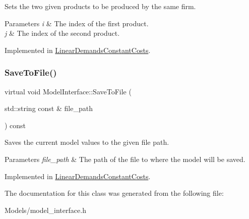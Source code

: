Sets the two given products to be produced by the same firm.


\begin{DoxyParams}{Parameters}
{\em i} & The index of the first product. \\
\hline
{\em j} & The index of the second product. \\
\hline
\end{DoxyParams}


Implemented in \hyperlink{classLinearDemandsConstantCosts_a0ee422d927b5a85f9aba8782b02f537b}{Linear\+Demands\+Constant\+Costs}.

\mbox{\label{classModelInterface_ab5709db8ecb96fd9efd02f4777d5502a}} 
\subsubsection{\texorpdfstring{Save\+To\+File()}{SaveToFile()}}
{\footnotesize\ttfamily virtual void Model\+Interface\+::\+Save\+To\+File (\begin{DoxyParamCaption}\item[{std\+::string const \&}]{file\+\_\+path }\end{DoxyParamCaption}) const\hspace{0.3cm}{\ttfamily [pure virtual]}}

Saves the current model values to the given file path.


\begin{DoxyParams}{Parameters}
{\em file\+\_\+path} & The path of the file to where the model will be saved. \\
\hline
\end{DoxyParams}


Implemented in \hyperlink{classLinearDemandsConstantCosts_aef2823751866a4933a8611dd4622d78b}{Linear\+Demands\+Constant\+Costs}.



The documentation for this class was generated from the following file\+:\begin{DoxyCompactItemize}
\item 
Models/model\+\_\+interface.\+h\end{DoxyCompactItemize}
